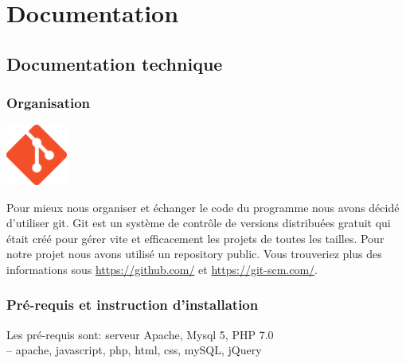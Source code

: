 \documentclass[a4paper,12pt,abstracton,titlepage]{scrartcl}
\begin{document}
\newpage
\section{Documentation}
\subsection{Documentation technique}
\subsubsection{Organisation}
\begin{floatingfigure}[r]{0.25\textwidth}
\includegraphics[width=0.15\textwidth]{./doc/git_logo.png}
\label{git}
\end{floatingfigure}

Pour mieux nous organiser et échanger le code du programme nous avons décidé d'utiliser git. Git est un système de contrôle de versions distribuées gratuit qui était créé pour gérer vite et efficacement les projets de toutes les tailles. Pour notre projet nous avons utilisé un repository public.
Vous trouveriez plus des informations sous \url{https://github.com/} et \url{https://git-scm.com/}.\\

\subsubsection{Pré-requis et instruction d'installation}
Les pré-requis sont:  serveur Apache, Mysql 5, PHP 7.0\\
-- apache, javascript, php, html, css, mySQL, jQuery
\end{document}
